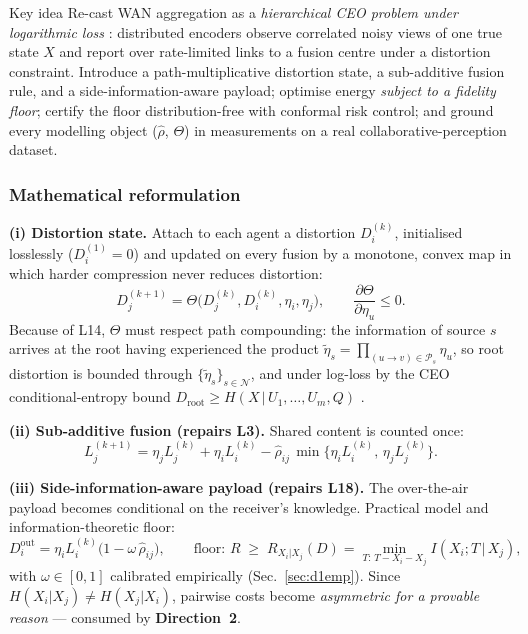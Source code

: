 \documentclass[11pt,a4paper]{article}
\newcommand{\Dir}[1]{\textcolor{accent}{\textbf{Direction~#1}}}
\begin{document}
\begin{ideabox}{Key idea}
Re-cast WAN aggregation as a \emph{hierarchical CEO problem under logarithmic loss} \cite{ceo,courtade}: distributed encoders observe correlated noisy views of one true state $X$ and report over rate-limited links to a fusion centre under a distortion constraint. Introduce a path-multiplicative distortion state, a sub-additive fusion rule, and a side-information-aware payload; optimise energy \emph{subject to a fidelity floor}; certify the floor distribution-free with conformal risk control; and ground every modelling object ($\hat\rho$, $\Theta$) in measurements on a real collaborative-perception dataset.
\end{ideabox}

\subsubsection{Mathematical reformulation}
\textbf{(i) Distortion state.} Attach to each agent a distortion $D_i^{(k)}$, initialised losslessly ($D_i^{(1)}{=}0$) and updated on every fusion by a monotone, convex map in which harder compression never reduces distortion:
\begin{equation}
D_j^{(k+1)}=\Theta\big(D_j^{(k)},D_i^{(k)},\eta_i,\eta_j\big),\qquad \frac{\partial \Theta}{\partial \eta_u}\le 0 .
\label{eq:theta}
\end{equation}
Because of L14, $\Theta$ must respect path compounding: the information of source $s$ arrives at the root having experienced the product $\tilde\eta_s=\prod_{(u\to v)\in\mathcal P_s}\eta_u$, so root distortion is bounded through $\{\tilde\eta_s\}_{s\in\mathcal N}$, and under log-loss by the CEO conditional-entropy bound $D_{\mathrm{root}}\ge H(X\,|\,U_1,\dots,U_m,Q)$ \cite{courtade}.

\textbf{(ii) Sub-additive fusion (repairs L3).} Shared content is counted once:
\begin{equation}
L_j^{(k+1)}=\eta_j L_j^{(k)}+\eta_i L_i^{(k)}-\hat\rho_{ij}\,\min\big\{\eta_i L_i^{(k)},\,\eta_j L_j^{(k)}\big\}.
\label{eq:subadd}
\end{equation}

\textbf{(iii) Side-information-aware payload (repairs L18).} The over-the-air payload becomes conditional on the receiver's knowledge. Practical model and information-theoretic floor:
\begin{equation}
D_i^{\mathrm{out}}=\eta_i L_i^{(k)}\big(1-\omega\,\hat\rho_{ij}\big),
\qquad\text{floor: } R \;\ge\; R_{X_i|X_j}(D)=\!\!\min_{T:\,T-X_i-X_j}\! I(X_i;T\,|\,X_j),
\label{eq:condpayload}
\end{equation}
with $\omega\in[0,1]$ calibrated empirically (Sec.~\ref{sec:d1emp}). Since $H(X_i|X_j)\neq H(X_j|X_i)$, pairwise costs become \emph{asymmetric for a provable reason} --- consumed by \Dir{2}.
\end{document}
